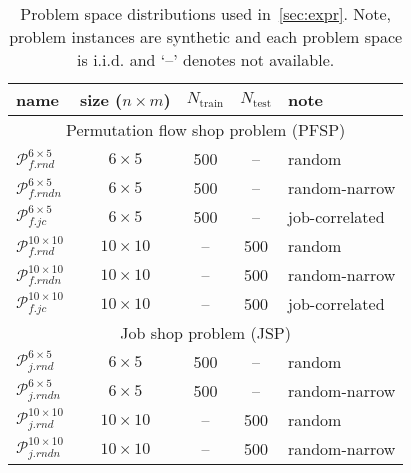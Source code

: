 \documentclass{acm_proc_article-sp}
\begin{document}
\begin{table}\centering
\caption{Problem space distributions used in~\cref{sec:expr}. Note, problem instances are synthetic and each problem space is i.i.d. and `--' denotes not available.}\label{tbl:data:sim}
{\renewcommand{\arraystretch}{1.5}
\begin{tabular}{|l|c|c|c|l|}\hline 
name&size ($n\times m$)& $N_{\text{train}}$&$N_{\text{test}}$  & note 
\\ \hline\hline
\multicolumn{5}{|c|}{Permutation flow shop problem (PFSP)} \\ \hline
$\mathcal{P}_{f.rnd}^{6\times5}$ &$6\times5$& 500&--& random \\ 
$\mathcal{P}_{f.rndn}^{6\times5}$&$6\times5$& 500&--& random-narrow \\ 
$\mathcal{P}_{f.jc}^{6\times5}$  &$6\times5$& 500&--& job-correlated \\ 
$\mathcal{P}_{f.rnd}^{10\times10}$ &$10\times10$&--&500&random \\ 
$\mathcal{P}_{f.rndn}^{10\times10}$&$10\times10$&--&500& random-narrow \\ 
$\mathcal{P}_{f.jc}^{10\times10}$  &$10\times10$&--&500& job-correlated \\ 
\hline\hline 
\multicolumn{5}{|c|}{Job shop problem (JSP)} \\ \hline
$\mathcal{P}_{j.rnd}^{6\times5}$ & $6\times5$ & 500 & -- & random \\
$\mathcal{P}_{j.rndn}^{6\times5}$ & $6\times5$ & 500 & -- & random-narrow \\
$\mathcal{P}_{j.rnd}^{10\times10}$ &$10\times10$& -- & 500 & random \\
$\mathcal{P}_{j.rndn}^{10\times10}$ &$10\times10$& -- & 500 & random-narrow \\ 
\hline
\end{tabular}
}
\end{table}
\end{document}
